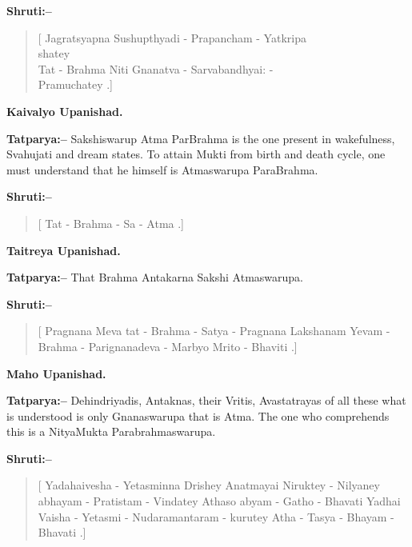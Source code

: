 \textbf{Shruti:–}

\begin{verse}
[ Jagratsyapna Sushupthyadi - Prapancham - Yatkripa\\shatey {}\\ Tat - Brahma Niti Gnanatva - Sarvabandhyai: -\\ Pramuchatey .]
\end{verse}

\begin{flushright}
\textbf{Kaivalyo Upanishad.}
\end{flushright}

\textbf{Tatparya:–} Sakshiswarup Atma ParBrahma is the one present in wakefulness, Svahujati and dream states. To attain Mukti from birth and death cycle, one must understand that he himself is Atmaswarupa ParaBrahma.

\newpage

\textbf{Shruti:–}

\begin{verse}
[ Tat - Brahma - Sa - Atma .]
\end{verse}

\begin{flushright}
\textbf{Taitreya Upanishad.}
\end{flushright}

\textbf{Tatparya:–} That Brahma Antakarna Sakshi Atmaswarupa.

\textbf{Shruti:–}

\begin{verse}
[ Pragnana Meva tat - Brahma - Satya - Pragnana Lakshanam  Yevam - Brahma - Parignanadeva - Marbyo Mrito - Bhaviti .]
\end{verse}

\begin{flushright}
\textbf{Maho Upanishad.}
\end{flushright}

\textbf{Tatparya:–} Dehindriyadis, Antaknas, their Vritis, Avastatrayas of all these what is understood is only Gnanaswarupa that is Atma. The one who comprehends this is a NityaMukta Parabrahmaswarupa.

\textbf{Shruti:–}

\begin{verse}
[ Yadahaivesha - Yetasminna Drishey Anatmayai Niruktey - Nilyaney abhayam - Pratistam - Vindatey  Athaso abyam - Gatho - Bhavati  Yadhai Vaisha - Yetasmi - Nudaramantaram - kurutey Atha - Tasya - Bhayam - Bhavati .]
\end{verse}

